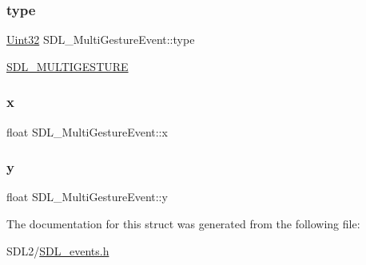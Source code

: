 \subsubsection{\texorpdfstring{type}{type}}
{\footnotesize\ttfamily \hyperlink{_s_d_l__stdinc_8h_add440eff171ea5f55cb00c4a9ab8672d}{Uint32} S\+D\+L\+\_\+\+Multi\+Gesture\+Event\+::type}

\hyperlink{_s_d_l__events_8h_a3b589e89be6b35c02e0dd34a55f3fccaaa225e29d8bf6e619dda824c81826c929}{S\+D\+L\+\_\+\+M\+U\+L\+T\+I\+G\+E\+S\+T\+U\+RE} \mbox{\label{struct_s_d_l___multi_gesture_event_a1708fc3c788fd12cc0beb5dc05cf31ca}} 
\subsubsection{\texorpdfstring{x}{x}}
{\footnotesize\ttfamily float S\+D\+L\+\_\+\+Multi\+Gesture\+Event\+::x}

\mbox{\label{struct_s_d_l___multi_gesture_event_a264602b9c5cc027eb6a283adda428454}} 
\subsubsection{\texorpdfstring{y}{y}}
{\footnotesize\ttfamily float S\+D\+L\+\_\+\+Multi\+Gesture\+Event\+::y}



The documentation for this struct was generated from the following file\+:\begin{DoxyCompactItemize}
\item 
S\+D\+L2/\hyperlink{_s_d_l__events_8h}{S\+D\+L\+\_\+events.\+h}\end{DoxyCompactItemize}
